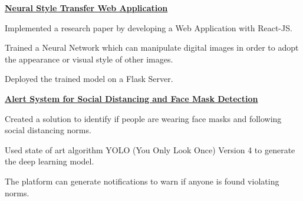 \begin{cventries}

  \cventry
    {\large \textbf{\href{https://github.com/snehsagarajput/nst-app}{Neural Style Transfer Web Application}}} %
    {} %
    {} %
    {} %
    {\vspace{-1.5mm}
      \begin{cvitems} %
        \item {Implemented a research paper by developing a Web Application with React-JS.}
        \item {Trained a Neural Network which can manipulate digital images in order to adopt the appearance or visual style of other images.}
        \item {Deployed the trained model on a Flask Server.}
      \end{cvitems}
   \vspace{1.5mm} }

\end{cventries}


\begin{cventries}

  \cventry
    {\large \textbf{\href{https://github.com/snehsagarajput/darknet}{Alert System for  Social Distancing and Face Mask Detection}}} %
    {} %
    {} %
    {} %
    {\vspace{-1.5mm}
      \begin{cvitems} %
        \item {Created a solution to identify if people are wearing face masks and following social distancing norms.}
        \item {Used state of art algorithm YOLO (You Only Look Once) Version 4 to generate the deep learning model.}
        \item {The platform can generate notifications to warn if anyone is found violating norms.}
      \end{cvitems}
    }

\end{cventries}
